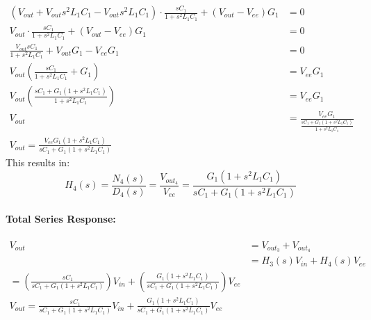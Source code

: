 \begin{enumerate}
\begin{enumerate}
\begin{align*}
            \left(V_{out} + V_{out}s^2 L_1 C_1 - V_{out}s^2 L_1 C_1\right) \cdot \frac{sC_1}{1 + s^2 L_1 C_1} + (V_{out} - V_{ee}){G_1} &= 0 \\
            V_{out} \cdot \frac{sC_1}{1 + s^2 L_1 C_1} + (V_{out} - V_{ee}){G_1} &= 0 \\
            \frac{V_{out} sC_1}{1 + s^2 L_1 C_1} + V_{out}G_1 - V_{ee}G_1 &= 0 \\
            V_{out}\left(\frac{sC_1}{1 + s^2 L_1 C_1} + G_1\right) &= V_{ee}G_1 \\
            V_{out}\left(\frac{sC_1 + G_1(1 + s^2 L_1 C_1)}{1 + s^2 L_1 C_1}\right) &= V_{ee}G_1 \\
            V_{out} &= \frac{V_{ee}G_1}{\frac{sC_1 + G_1(1 + s^2 L_1 C_1)}{1 + s^2 L_1 C_1}} \\
            V_{out} = \frac{V_{ee}G_1(1 + s^2 L_1 C_1)}{sC_1 + G_1(1 + s^2 L_1 C_1)}
          \end{align*}
          This results in:
          \[
            \boxed{H_4(s) = \frac{N_4(s)}{D_4(s)} = \frac{V_{out_4}}{V_{ee}} = \frac{G_1(1 + s^2 L_1 C_1)}{sC_1 + G_1(1 + s^2 L_1 C_1)}}
          \]
      \end{enumerate}
    \paragraph{Total Series Response:}
      \begin{align*}
        V_{out} &= V_{out_3} + V_{out_4} \\
                &= H_3(s)V_{in} + H_4(s)V_{ee} \\
                = \left(\frac{sC_1}{sC_1 + G_1(1 + s^2 L_1 C_1)}\right)V_{in} + \left(\frac{G_1(1 + s^2 L_1 C_1)}{sC_1 + G_1(1 + s^2 L_1 C_1)}\right)V_{ee} \\
                \boxed{V_{out} = \frac{sC_1}{sC_1 + G_1(1 + s^2 L_1 C_1)}V_{in} + \frac{G_1(1 + s^2 L_1 C_1)}{sC_1 + G_1(1 + s^2 L_1 C_1)}V_{ee}}
      \end{align*}
\end{enumerate}

